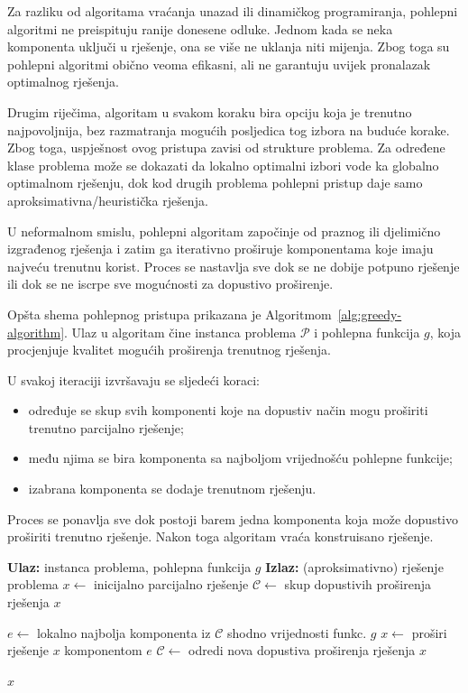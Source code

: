 Za razliku od algoritama vraćanja unazad ili dinamičkog programiranja, pohlepni algoritmi ne preispituju ranije donesene odluke. Jednom kada se neka komponenta uključi u rješenje, ona se više ne uklanja niti mijenja. Zbog toga su pohlepni algoritmi obično veoma efikasni, ali ne garantuju uvijek pronalazak optimalnog rješenja.

Drugim riječima, algoritam u svakom koraku bira opciju koja je trenutno najpovoljnija, bez razmatranja mogućih posljedica tog izbora na buduće korake. Zbog toga, uspješnost ovog pristupa zavisi od strukture problema. Za određene klase problema može se dokazati da lokalno optimalni izbori vode ka globalno optimalnom rješenju, dok kod drugih problema pohlepni pristup daje samo aproksimativna/heuristička rješenja. 

U neformalnom smislu, pohlepni algoritam započinje od praznog ili djelimično izgrađenog rješenja i zatim ga iterativno proširuje komponentama koje imaju najveću trenutnu korist. Proces se nastavlja sve dok se ne dobije potpuno rješenje ili dok se ne iscrpe sve mogućnosti za dopustivo proširenje.

Opšta shema pohlepnog pristupa prikazana je Algoritmom~\ref{alg:greedy-algorithm}. Ulaz u algoritam čine instanca problema $\mathcal{P}$ i pohlepna funkcija $g$, koja procjenjuje kvalitet mogućih proširenja trenutnog rješenja.

U svakoj iteraciji izvršavaju se sljedeći koraci:

\begin{itemize}
	\item određuje se skup svih komponenti koje na dopustiv način mogu proširiti trenutno parcijalno rješenje;
	\item među njima se bira komponenta sa najboljom vrijednošću pohlepne funkcije;
	\item izabrana komponenta se dodaje trenutnom rješenju.
\end{itemize}

Proces se ponavlja sve dok postoji barem jedna komponenta koja može dopustivo proširiti trenutno rješenje. Nakon toga algoritam vraća konstruisano rješenje.

\begin{algorithm}
	\begin{algorithmic}[1]
		\State \textbf{Ulaz:} instanca problema, pohlepna funkcija $g$
		\State \textbf{Izlaz:} (aproksimativno) rješenje problema
		\State $x \gets$ inicijalno parcijalno rješenje
		\State $\mathcal{C} \gets$ skup dopustivih proširenja rješenja $x$
		
		\State $e \gets$ lokalno najbolja komponenta iz $\mathcal{C}$ shodno vrijednosti funkc. $g$
		\State $x \gets$ proširi rješenje $x$ komponentom $e$
		\State $\mathcal{C} \gets$ odredi nova dopustiva proširenja rješenja $x$
		\EndWhile
		
		\State \Return $x$
	\end{algorithmic}
	\caption{Opšta shema pohlepnog algoritma.}
	\label{alg:greedy-algorithm}
\end{algorithm}


